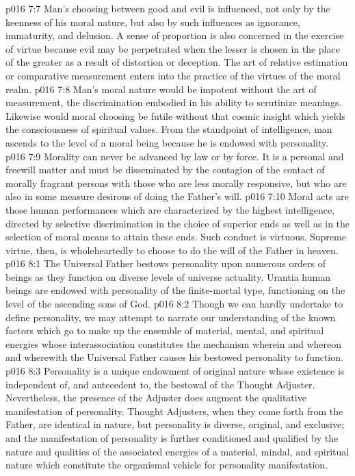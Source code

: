 \vs p016 7:7 Man’s choosing between good and evil is influenced, not only by the keenness of his moral nature, but also by such influences as ignorance, immaturity, and delusion. A sense of proportion is also concerned in the exercise of virtue because evil may be perpetrated when the lesser is chosen in the place of the greater as a result of distortion or deception. The art of relative estimation or comparative measurement enters into the practice of the virtues of the moral realm.
\pc \vs p016 7:8 Man’s moral nature would be impotent without the art of measurement, the discrimination embodied in his ability to scrutinize meanings. Likewise would moral choosing be futile without that cosmic insight which yields the consciousness of spiritual values. From the standpoint of intelligence, man ascends to the level of a moral being because he is endowed with personality.
\pc \vs p016 7:9 Morality can never be advanced by law or by force. It is a personal and freewill matter and must be disseminated by the contagion of the contact of morally fragrant persons with those who are less morally responsive, but who are also in some measure desirous of doing the Father’s will.
\vs p016 7:10 Moral acts are those human performances which are characterized by the highest intelligence, directed by selective discrimination in the choice of superior ends as well as in the selection of moral means to attain these ends. Such conduct is virtuous. Supreme virtue, then, is wholeheartedly to choose to do the will of the Father in heaven.
\vs p016 8:1 The Universal Father bestows personality upon numerous orders of beings as they function on diverse levels of universe actuality. Urantia human beings are endowed with personality of the finite\hyp{}mortal type, functioning on the level of the ascending sons of God.
\vs p016 8:2 Though we can hardly undertake to define personality, we may attempt to narrate our understanding of the known factors which go to make up the ensemble of material, mental, and spiritual energies whose interassociation constitutes the mechanism wherein and whereon and wherewith the Universal Father causes his bestowed personality to function.
\vs p016 8:3 Personality is a unique endowment of original nature whose existence is independent of, and antecedent to, the bestowal of the Thought Adjuster. Nevertheless, the presence of the Adjuster does augment the qualitative manifestation of personality. Thought Adjusters, when they come forth from the Father, are identical in nature, but personality is diverse, original, and exclusive; and the manifestation of personality is further conditioned and qualified by the nature and qualities of the associated energies of a material, mindal, and spiritual nature which constitute the organismal vehicle for personality manifestation.
